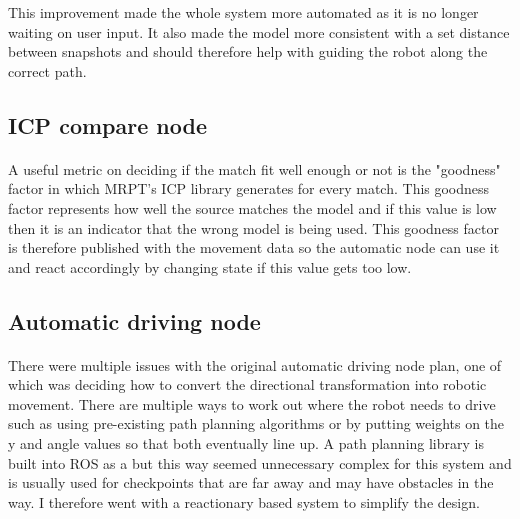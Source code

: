 This improvement made the whole system more automated as it is no longer waiting on user input. It also made the model more consistent with a set distance between snapshots and should therefore help with guiding the robot along the correct path.

\subsection{ICP compare node}
\paragraph{}
A useful metric on deciding if the match fit well enough or not is the "goodness" factor in which MRPT's ICP library generates for every match. This goodness factor represents how well the source matches the model and if this value is low then it is an indicator that the wrong model is being used. This goodness factor is therefore published with the movement data so the automatic node can use it and react accordingly by changing state if this value gets too low.

\subsection{Automatic driving node}
\paragraph{}
There were multiple issues with the original automatic driving node plan, one of which was deciding how to convert the directional transformation into robotic movement. There are multiple ways to work out where the robot needs to drive such as using pre-existing path planning algorithms or by putting weights on the y and angle values so that both eventually line up. A path planning library is built into ROS as a \cite{ROS-Path} but this way seemed unnecessary complex for this system and is usually used for checkpoints that are far away and may have obstacles in the way. I therefore went with a reactionary based system to simplify the design.

